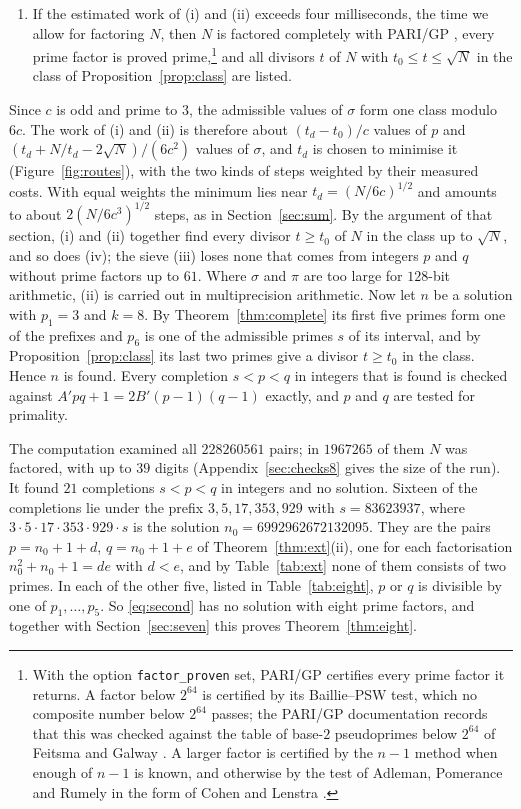 \documentclass[11pt,reqno]{amsart}
\numberwithin{equation}{section}
\theoremstyle{plain}
\theoremstyle{definition}
\theoremstyle{remark}
\begin{document}
\begin{enumerate}[label=\textup{(\roman*)}, leftmargin=*]
  particular every value that comes from primes.
\item If the estimated work of (i) and (ii) exceeds four milliseconds,
  the time we allow for factoring $N$, then $N$ is factored completely with
  PARI/GP \cite{PARI}, every prime factor is proved
  prime,\footnote{With the option \texttt{factor\_proven} set, PARI/GP
  certifies every prime factor it returns. A factor below $2^{64}$ is
  certified by its Baillie--PSW test, which no composite number below
  $2^{64}$ passes; the PARI/GP documentation records that this was
  checked against the table of base-$2$ pseudoprimes below $2^{64}$ of
  Feitsma and Galway \cite{FG}. A larger factor is certified by the
  $n-1$ method \cite{BLS75} when enough of $n-1$ is known, and
  otherwise by the test of Adleman, Pomerance and Rumely
  \cite{APR83} in the form of Cohen and Lenstra \cite{CL84}.} and all
  divisors $t$ of $N$ with $t_0\le t\le\sqrt N$ in the class of
  Proposition~\ref{prop:class} are listed.
\end{enumerate}
Since $c$ is odd and prime to $3$, the admissible values of $\sigma$
form one class modulo $6c$. The work of (i) and (ii) is therefore about
$(t_d-t_0)/c$ values of $p$ and $(t_d+N/t_d-2\sqrt N)/(6c^2)$ values of
$\sigma$, and $t_d$ is chosen to minimise it (Figure~\ref{fig:routes}),
with the two kinds of steps weighted by their measured costs. With equal weights the minimum
lies near $t_d=(N/6c)^{1/2}$ and amounts to about $2(N/6c^3)^{1/2}$
steps, as in Section~\ref{sec:sum}. By the argument of that section,
(i) and (ii) together find every divisor $t\ge t_0$ of $N$ in the class
up to $\sqrt N$, and so does (iv); the sieve (iii) loses none that
comes from integers $p$ and $q$ without prime factors up to $61$. Where
$\sigma$ and $\pi$ are too large for $128$-bit arithmetic, (ii) is
carried out in multiprecision arithmetic. Now let $n$ be a solution with
$p_1=3$ and $k=8$. By Theorem~\ref{thm:complete} its first five primes
form one of the prefixes and $p_6$ is one of the admissible primes $s$
of its interval, and by Proposition~\ref{prop:class} its last two
primes give a divisor $t\ge t_0$ in the class. Hence $n$ is found.
Every completion $s<p<q$ in integers that is found is checked against
$A'pq+1=2B'(p-1)(q-1)$ exactly, and $p$ and $q$ are tested for
primality.

The computation examined all $228260561$ pairs; in $1967265$ of them
$N$ was factored, with up to $39$ digits (Appendix~\ref{sec:checks8}
gives the size of the run). It found $21$ completions $s<p<q$ in
integers and no solution. Sixteen of the completions lie under the prefix
$3,5,17,353,929$ with $s=83623937$, where
$3\cdot5\cdot17\cdot353\cdot929\cdot s$ is the solution
$n_0=6992962672132095$. They are the pairs $p=n_0+1+d$, $q=n_0+1+e$ of
Theorem~\ref{thm:ext}(ii), one for each factorisation
$n_0^2+n_0+1=de$ with $d<e$, and by Table~\ref{tab:ext} none of them
consists of two primes. In each of the other five, listed in
Table~\ref{tab:eight}, $p$ or $q$ is divisible by one of
$p_1,\dots,p_5$. So \eqref{eq:second} has no solution with eight prime
factors, and
together with Section~\ref{sec:seven} this proves
Theorem~\ref{thm:eight}.
\end{document}
